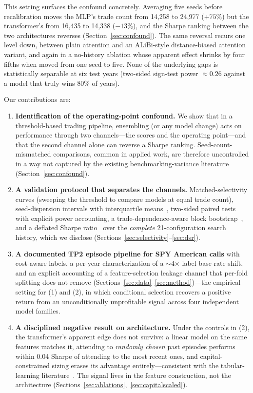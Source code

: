 \documentclass[sigconf,review,anonymous]{acmart}
\begin{document}
This setting surfaces the confound concretely. Averaging five seeds before recalibration moves the MLP's trade count from 14{,}258 to 24{,}977 ($+75\%$) but the transformer's from 16{,}435 to 14{,}338 ($-13\%$), and the Sharpe ranking between the two architectures reverses (Section~\ref{sec:confound}). The same reversal recurs one level down, between plain attention and an ALiBi-style distance-biased attention variant, and again in a no-history ablation whose apparent effect shrinks by four fifths when moved from one seed to five. None of the underlying gaps is statistically separable at six test years (two-sided sign-test power $\approx0.26$ against a model that truly wins 80\% of years).

Our contributions are:
\begin{enumerate}
\item \textbf{Identification of the operating-point confound.} We show that in a threshold-based trading pipeline, ensembling (or any model change) acts on performance through two channels---the scores and the operating point---and that the second channel alone can reverse a Sharpe ranking. Seed-count-mismatched comparisons, common in applied work, are therefore uncontrolled in a way not captured by the existing benchmarking-variance literature (Section~\ref{sec:confound}).
\item \textbf{A validation protocol that separates the channels.} Matched-selectivity curves (sweeping the threshold to compare models at equal trade count), seed-dispersion intervals with interquartile means~\cite{agarwal2021deep}, two-sided paired tests with explicit power accounting, a trade-dependence-aware block bootstrap~\cite{kunsch1989}, and a deflated Sharpe ratio~\cite{bailey2014deflated} over the \emph{complete} 21-configuration search history, which we disclose (Sections~\ref{sec:selectivity}--\ref{sec:dsr}).
\item \textbf{A documented TP2 episode pipeline for SPY American calls} with cost-aware labels, a per-year characterization of a $\sim$4$\times$ label-base-rate shift, and an explicit accounting of a feature-selection leakage channel that per-fold splitting does not remove (Sections~\ref{sec:data}--\ref{sec:method})---the empirical setting for (1) and (2), in which conditional selection recovers a positive return from an unconditionally unprofitable signal across four independent model families.
\item \textbf{A disciplined negative result on architecture.} Under the controls in (2), the transformer's apparent edge does not survive: a linear model on the same features matches it, attending to \emph{randomly chosen} past episodes performs within 0.04 Sharpe of attending to the most recent ones, and capital-constrained sizing erases its advantage entirely---consistent with the tabular-learning literature~\cite{grinsztajn2022why,shwartzziv2022tabular,gorishniy2021revisiting}. The signal lives in the feature construction, not the architecture (Sections~\ref{sec:ablations},~\ref{sec:capitalscaled}).
\end{enumerate}
\end{document}
